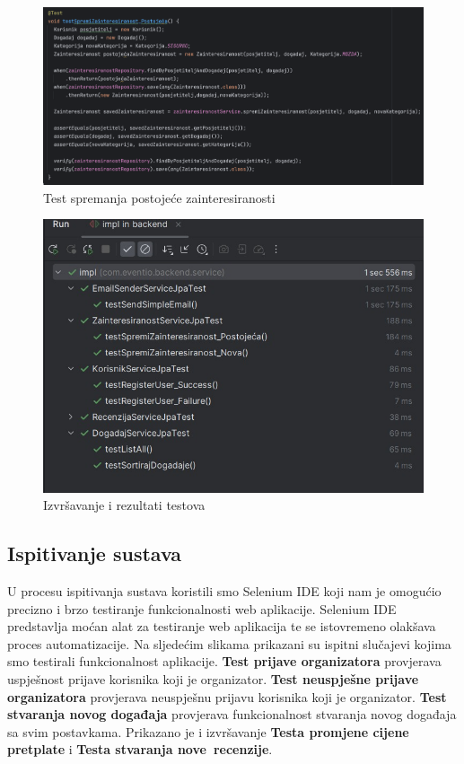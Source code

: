 			\begin{figure}[H]
				\includegraphics[scale=0.45]{testovi/zainteresiranostTest2.png}
				\centering
				\caption{Test spremanja postojeće zainteresiranosti}
				\label{fig:promjene}
			\end{figure}
			
				\begin{figure}[H]
				\includegraphics[scale=0.45]{testovi/unit_testovi.jpeg}
				\centering
				\caption{Izvršavanje i rezultati testova}
				\label{fig:promjene}
			\end{figure}
			
			
			\subsection{Ispitivanje sustava}
			
			U procesu ispitivanja sustava koristili smo Selenium IDE koji nam je omogućio precizno i brzo testiranje funkcionalnosti web aplikacije. Selenium IDE predstavlja moćan alat za testiranje web aplikacija te se istovremeno olakšava proces automatizacije. \newline Na sljedećim slikama prikazani su ispitni slučajevi kojima smo testirali funkcionalnost aplikacije. \textbf{Test prijave organizatora} provjerava uspješnost prijave korisnika koji je organizator. \textbf{Test neuspješne prijave organizatora} provjerava neuspješnu prijavu korisnika koji je organizator. \textbf{Test stvaranja novog događaja} provjerava funkcionalnost stvaranja novog događaja sa svim postavkama. Prikazano je i izvršavanje \textbf{Testa promjene cijene pretplate} i \textbf{Testa stvaranja nove recenzije}.
			
